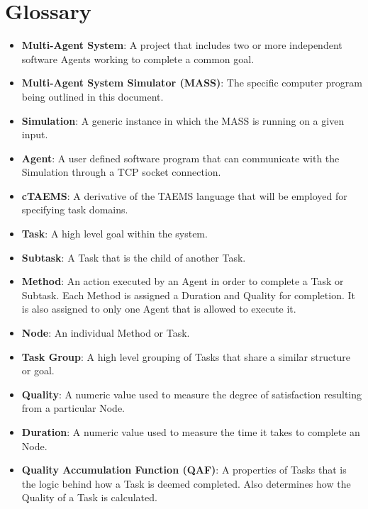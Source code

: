 \section{Glossary}
\begin{itemize}

\item{\textbf{Multi-Agent System}: A project that includes two or more independent software Agents working to complete a common goal.}

\item{\textbf{Multi-Agent System Simulator (MASS)}: The specific computer program being outlined in this document.}

\item{\textbf{Simulation}: A generic instance in which the MASS is running on a given input.}

\item{\textbf{Agent}: A user defined software program that can communicate with the Simulation through a TCP socket connection.}

\item{\textbf{cTAEMS}:   A derivative of the TAEMS language that will be employed for specifying task domains.}

\item{\textbf{Task}: A high level goal within the system.}

\item{\textbf{Subtask}: A Task that is the child of another Task.}

\item{\textbf{Method}: An action executed by an Agent in order to complete a Task or Subtask. Each Method is assigned a Duration and Quality for completion. It is also assigned to only one Agent that is allowed to execute it.}

\item{\textbf{Node}: An individual Method or Task.}

\item{\textbf{Task Group}: A high level grouping of Tasks that share a similar structure or goal.}

\item{\textbf{Quality}: A numeric value used to measure the degree of satisfaction resulting from a particular Node.}

\item{\textbf{Duration}: A numeric value used to measure the time it takes to complete an Node.}

\item{\textbf{Quality Accumulation Function (QAF)}: A properties of Tasks that is the logic behind how a Task is deemed completed. Also determines how the Quality of a Task is calculated.}


\end{itemize}
